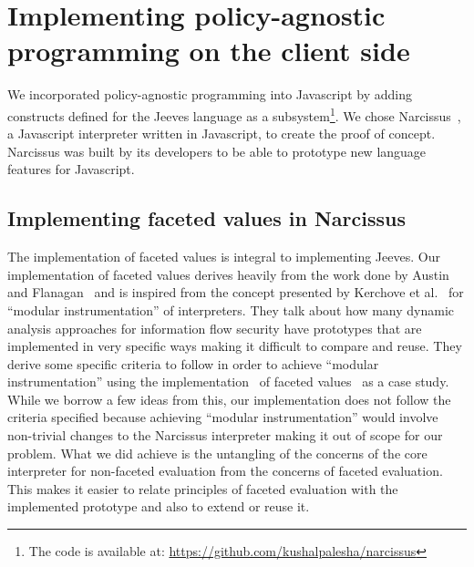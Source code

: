 \chapter{Implementing policy-agnostic programming on the client side\label{chap:solution}}
We incorporated policy-agnostic programming into Javascript by adding constructs
defined for the Jeeves language as a subsystem\footnote{The code is available at:
\url{https://github.com/kushalpalesha/narcissus}}. We chose Narcissus~\cite{narc},
a Javascript interpreter written in Javascript, to create the proof of concept.
Narcissus was built by its developers to be able to prototype new language features
for Javascript.

\section{Implementing faceted values in Narcissus}
The implementation of faceted values is integral to implementing Jeeves. Our implementation
of faceted values derives heavily from the work done by Austin and Flanagan~\cite{Faceted}
and is inspired from the concept presented by Kerchove et al.~\cite{Modular} for
``modular instrumentation'' of interpreters. They talk about how many dynamic analysis
approaches for information flow security have prototypes that are implemented in
very specific ways making it difficult to compare and reuse. They derive some
specific criteria to follow in order to achieve ``modular instrumentation'' using
the implementation~\cite{ZaphodFacets} of faceted values~\cite{Faceted} as a case
study. While we borrow a few ideas from this, our implementation does not follow
the criteria specified because achieving ``modular instrumentation'' would involve
non-trivial changes to the Narcissus interpreter making it out of scope for our problem.
What we did achieve is the untangling of the concerns of the core interpreter for
non-faceted evaluation from the concerns of faceted evaluation. This makes it easier
to relate principles of faceted evaluation with the implemented prototype and also
to extend or reuse it.

